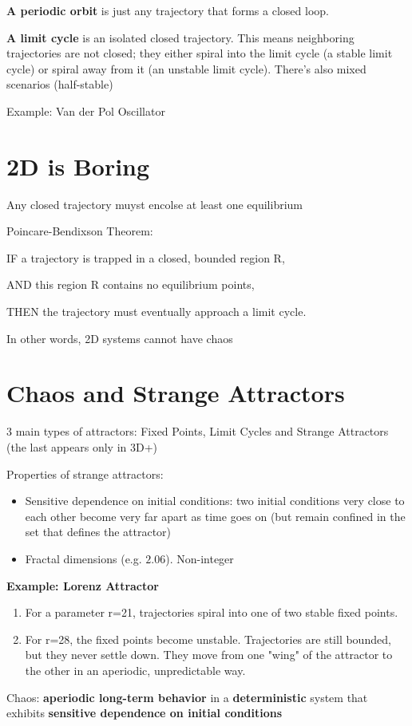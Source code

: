 \documentclass{report}
\begin{document}
\textbf{A periodic orbit} is just any trajectory that forms a closed loop.

\textbf{A limit cycle} is an isolated closed trajectory. 
This means neighboring trajectories are not closed; they either spiral into the limit cycle (a stable limit cycle) or spiral away from it (an unstable limit cycle).
There's also mixed scenarios (half-stable)

Example: Van der Pol Oscillator

\section*{2D is Boring}

\begin{theorem}
Any closed trajectory muyst encolse at least one equilibrium
\end{theorem}
\begin{theorem}{Poincare-Bendixson Theorem:}

IF a trajectory is trapped in a closed, bounded region R,

AND this region R contains no equilibrium points,

THEN the trajectory must eventually approach a limit cycle.
\end{theorem}

In other words, 2D systems cannot have chaos 

\section*{Chaos and Strange Attractors}

3 main types of attractors: Fixed Points, Limit Cycles and Strange Attractors (the last 
appears only in 3D+)

Properties of strange attractors:
\begin{itemize}
  \item Sensitive dependence on initial conditions: two initial conditions very 
  close to each other become very far apart as time goes on (but remain confined in the set 
  that defines the attractor)
  \item Fractal dimensions (e.g. $2.06$). Non-integer
\end{itemize}

\textbf{Example: Lorenz Attractor}
\begin{enumerate}
  \item For a parameter r=21, trajectories spiral into one of two stable fixed points.
  \item For r=28, the fixed points become unstable. Trajectories are still 
  bounded, but they never settle down. They move from one "wing" of the 
  attractor to the other in an aperiodic, unpredictable way.
\end{enumerate}

\begin{definition}
Chaos: \textbf{aperiodic long-term behavior} in a \textbf{deterministic} system that exhibits 
\textbf{sensitive dependence on initial conditions}
\end{definition}
\end{document}
